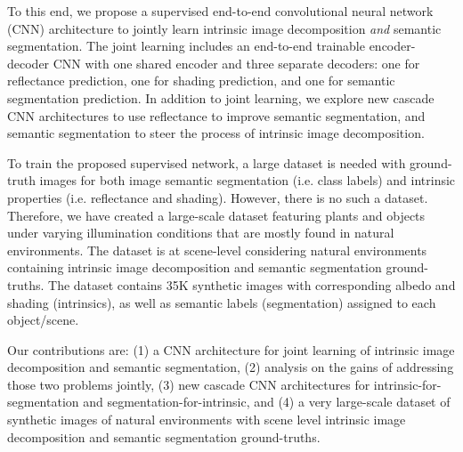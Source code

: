 \documentclass[runningheads]{llncs}
\begin{document}
To this end, we propose a supervised end-to-end convolutional neural network (CNN) architecture to jointly learn intrinsic image decomposition {\em and} semantic segmentation. The joint learning includes an end-to-end trainable encoder-decoder CNN with one shared encoder and three separate decoders: one for reflectance prediction, one for shading prediction, and one for semantic segmentation prediction. In addition to joint learning, we explore new cascade CNN architectures to use reflectance to improve semantic segmentation, and semantic segmentation to steer the process of intrinsic image decomposition. 

To train the proposed supervised network, a large dataset is needed with ground-truth images for both image semantic segmentation (i.e. class labels) and intrinsic properties (i.e. reflectance and shading). However, there is no such a dataset. Therefore, we have created a large-scale dataset featuring plants and objects under varying illumination conditions that are mostly found in natural environments. The dataset is at scene-level considering natural environments containing intrinsic image decomposition and semantic segmentation ground-truths. The dataset contains 35K synthetic images with corresponding albedo and shading (intrinsics), as well as semantic labels (segmentation) assigned to each object/scene. 

Our contributions are: (1) a CNN architecture for joint learning of intrinsic image decomposition and semantic segmentation, (2) analysis on the gains of addressing those two problems jointly, (3) new cascade CNN architectures for intrinsic-for-segmentation and segmentation-for-intrinsic, and (4) a very large-scale dataset of synthetic images of natural environments with scene level intrinsic image decomposition and semantic segmentation ground-truths.
\end{document}
